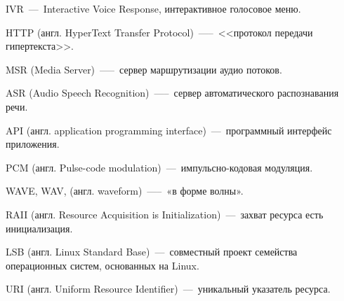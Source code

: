 
\hypertarget{ivr}{IVR~---~Interactive Voice Response, интерактивное голосовое меню.}

\hypertarget{http}{HTTP (англ. HyperText Transfer Protocol)~—--~<<протокол передачи \\ \mbox{гипертекста}>>.}

\hypertarget{msr}{MSR (Media Server)~—--~сервер маршрутизации аудио потоков.}

\hypertarget{asr}{ASR (Audio Speech Recognition)~—--~сервер автоматического распознавания речи.}

\hypertarget{api}{API (англ. application programming interface)~---~программный интерфейс приложения.}

\hypertarget{pcm}{PCM (англ. Pulse-code modulation)~---~импульсно-кодовая модуляция.}

\hypertarget{wav}{WAVE, WAV, (англ. waveform)~—--~«в форме волны».}

\hypertarget{raii}{RAII (англ. Resource Acquisition is Initialization)~---~захват ресурса есть инициализация.}

\hypertarget{lsb}{LSB (англ. Linux Standard Base)~---~совместный проект семейства операционных систем, основанных на Linux.}

\hypertarget{uri}{URI (англ. Uniform Resource Identifier)~---~уникальный указатель ресурса.}

\clearpage
